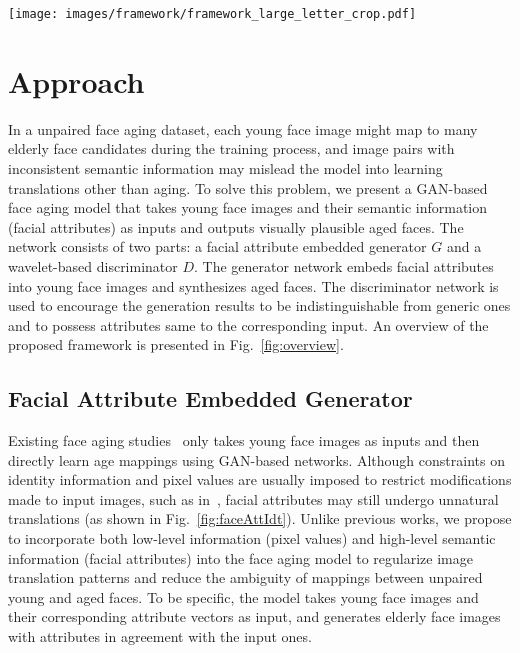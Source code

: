 \documentclass[10pt,twocolumn,letterpaper]{article}
\begin{document}
\begin{figure*}[ht]
\begin{center}
\texttt{[image: images/framework/framework\_large\_letter\_crop.pdf]}
\end{center}
\caption{An overview of the proposed face aging framework. An hourglass-shaped generator $G$ learns the age mapping and outputs lifelike elderly face images. A discriminator $D$ is employed to distinguish synthesized face images from generic ones, based on multi-scale wavelet coefficients computed by the wavelet packet transform module. The $p$-dimensional attribute vector describing the input face image is embedded to both the generator and the discriminator to reduce matching ambiguity inherent to unpaired training data and ensure facial attribute consistency.}
\label{fig:overview}
\end{figure*}

\section{Approach}
In a unpaired face aging dataset, each young face image might map to many elderly face candidates during the training process, and image pairs with inconsistent semantic information may mislead the model into learning translations other than aging.
To solve this problem, we present a GAN-based face aging model that takes young face images and their semantic information (\ie facial attributes) as inputs and outputs visually plausible aged faces.
The network consists of two parts: a facial attribute embedded generator $G$ and a wavelet-based discriminator $D$. The generator network embeds facial attributes into young face images and synthesizes aged faces. The discriminator network is used to encourage the generation results to be indistinguishable from generic ones and to possess attributes same to the corresponding input.
An overview of the proposed framework is presented in Fig.~\ref{fig:overview}.

\subsection{Facial Attribute Embedded Generator}
Existing face aging studies~\cite{yang2017learning,li2018global,zhang2017age} only takes young face images as inputs and then directly learn age mappings using GAN-based networks.
Although constraints on identity information and pixel values are usually imposed to restrict modifications made to input images, such as in~\cite{yang2017learning}, facial attributes may still undergo unnatural translations (as shown in Fig.~\ref{fig:faceAttIdt}).
Unlike previous works, we propose to incorporate both low-level information (pixel values) and high-level semantic information (facial attributes) into the face aging model to regularize image translation patterns and reduce the ambiguity of mappings between unpaired young and aged faces.
To be specific, the model takes young face images and their corresponding attribute vectors as input, and generates elderly face images with attributes in agreement with the input ones. 
\end{document}
